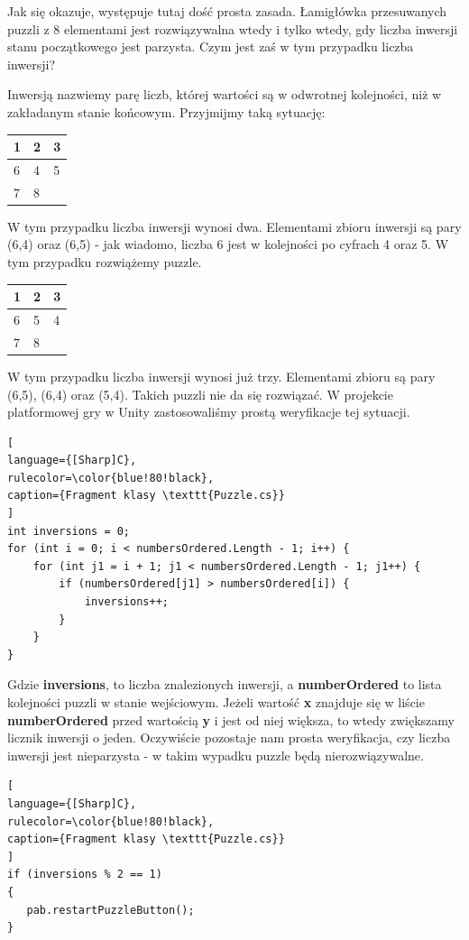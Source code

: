 \documentclass[oneside,polski,logo]{amuthesis}
\begin{document}
Jak się okazuje, występuje tutaj dość prosta zasada. Łamigłówka przesuwanych puzzli z 8 elementami jest rozwiązywalna wtedy i tylko wtedy, gdy liczba inwersji stanu początkowego jest parzysta. Czym jest zaś w tym przypadku liczba inwersji?

Inwersją nazwiemy parę liczb, której wartości są w odwrotnej kolejności, niż w zakładanym stanie końcowym. \cite{solvablePuzzle} Przyjmijmy taką sytuację:

\begin{center}
\begin{tabular}{ | m{5em} | m{1cm}| m{1cm} | } 
\hline
 1 & 2 & 3 \\ 
\hline
 6 & 4 & 5 \\
\hline  
 7 & 8 &     \\
\hline
\end{tabular}
\end{center}

W tym przypadku liczba inwersji wynosi dwa. Elementami zbioru inwersji są pary (6,4) oraz (6,5) - jak wiadomo, liczba 6 jest w kolejności po cyfrach 4 oraz 5. W tym przypadku rozwiążemy puzzle.

\begin{center}
\begin{tabular}{ | m{5em} | m{1cm}| m{1cm} | } 
\hline
 1 & 2 & 3 \\ 
\hline
 6 & 5 & 4 \\  
\hline
 7 & 8 &     \\
\hline
\end{tabular}
\end{center}

W tym przypadku liczba inwersji wynosi już trzy. Elementami zbioru są pary (6,5), (6,4) oraz (5,4). Takich puzzli nie da się rozwiązać. 
W projekcie platformowej gry w Unity zastosowaliśmy prostą weryfikacje tej sytuacji. 

\begin{lstlisting}[
language={[Sharp]C},
rulecolor=\color{blue!80!black},
caption={Fragment klasy \texttt{Puzzle.cs}}
]
int inversions = 0;
for (int i = 0; i < numbersOrdered.Length - 1; i++) {
    for (int j1 = i + 1; j1 < numbersOrdered.Length - 1; j1++) {
        if (numbersOrdered[j1] > numbersOrdered[i]) {
            inversions++;
        }
    }
}

\end{lstlisting}
Gdzie \textbf{inversions}, to liczba znalezionych inwersji, a \textbf{numberOrdered} to lista kolejności puzzli w stanie wejściowym. Jeżeli wartość \textbf{x} znajduje się w liście \textbf{numberOrdered} przed wartością \textbf{y} i jest od niej większa, to wtedy zwiększamy licznik inwersji o jeden.
Oczywiście pozostaje nam prosta weryfikacja, czy liczba inwersji jest nieparzysta - w takim wypadku puzzle będą nierozwiązywalne.
\begin{lstlisting}[
language={[Sharp]C},
rulecolor=\color{blue!80!black},
caption={Fragment klasy \texttt{Puzzle.cs}}
]
if (inversions % 2 == 1)
{
   pab.restartPuzzleButton();
}
\end{lstlisting}
\end{document}
